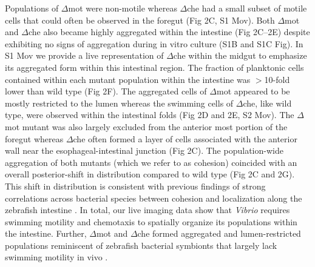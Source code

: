 Populations of $\Delta$mot were non-motile whereas $\Delta$che had a small subset of motile cells that could often be observed in the foregut (Fig 2C, S1 Mov). Both $\Delta$mot and $\Delta$che also became highly aggregated within the intestine (Fig 2C–2E) despite exhibiting no signs of aggregation during in vitro culture (S1B and S1C Fig). In S1 Mov we provide a live representation of $\Delta$che within the midgut to emphasize its aggregated form within this intestinal region. The fraction of planktonic cells contained within each mutant population within the intestine was $ > $10-fold lower than wild type (Fig 2F). The aggregated cells of $\Delta$mot appeared to be mostly restricted to the lumen whereas the swimming cells of $\Delta$che, like wild type, were observed within the intestinal folds (Fig 2D and 2E, S2 Mov). The $\Delta$mot mutant was also largely excluded from the anterior most portion of the foregut whereas $\Delta$che often formed a layer of cells associated with the anterior wall near the esophageal-intestinal junction (Fig 2C). The population-wide aggregation of both mutants (which we refer to as cohesion) coincided with an overall posterior-shift in distribution compared to wild type (Fig 2C and 2G). This shift in distribution is consistent with previous findings of strong correlations across bacterial species between cohesion and localization along the zebrafish intestine \cite{schlomann_bacterial_2018}. In total, our live imaging data show that \textit{Vibrio} requires swimming motility and chemotaxis to spatially organize its populations within the intestine. Further, $\Delta$mot and $\Delta$che formed aggregated and lumen-restricted populations reminiscent of zebrafish bacterial symbionts that largely lack swimming motility in vivo \cite{wiles_modernized_2018,schlomann_bacterial_2018}. 


